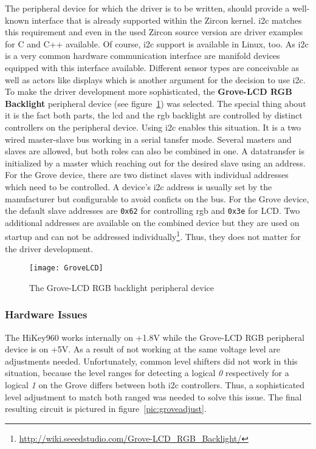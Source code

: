 The peripheral device for which the driver is to be written, should provide a well-known interface that is already supported within the Zircon kernel.
\ac{i2c} matches this requirement and even in the used Zircon source version are driver examples for C and C++ available.
Of course, \ac{i2c} support is available in Linux, too.
As \ac{i2c} is a very common hardware communication interface are manifold devices equipped with this interface available.
Different sensor types are conceivable as well as actors like displays which is another argument for the decision to use \ac{i2c}.
To make the driver development more sophisticated, the \textbf{Grove-LCD RGB Backlight} peripheral device (see figure~\ref{pic:grove}) was selected.
The special thing about it is the fact both parts, the \ac{lcd} and the \acs{rgb} backlight are controlled by distinct controllers on the peripheral device.
Using \ac{i2c} enables this situation.
It is a two wired master-slave bus working in a serial tansfer mode.
Several masters and slaves are allowed, but both roles can also be combined in one.
A datatransfer is initialized by a master which reaching out for the desired slave using an address.
For the Grove device, there are two distinct slaves with individual addresses which need to be controlled.
A device's \ac{i2c} address is usually set by the manufacturer but configurable to avoid conficts on the bus.
For the Grove device, the default slave addresses are \texttt{0x62} for controlling \ac{rgb} and \texttt{0x3e} for LCD\@.
Two additional addresses are available on the combined device but they are used on startup and can not be addressed individually\footnote{\url{http://wiki.seeedstudio.com/Grove-LCD_RGB_Backlight/}}.
Thus, they does not matter for the driver development.

\begin{figure} [t]
    \centering
    \texttt{[image: GroveLCD]}
    \caption{The Grove-LCD RGB backlight peripheral device}\label{pic:grove}
\end{figure} 

\subsubsection*{Hardware Issues}
The HiKey960 works internally on +1.8V  while the Grove-LCD RGB peripheral device is on +5V.
As a result of not working at the same voltage level are adjustments needed.
Unfortunately, common level shifters did not work in this situation, because the level ranges for detecting a logical \textit{0} respectively for a logical \textit{1} on the Grove differs between both \ac{i2c} controllers.
Thus, a sophisticated level adjustment to match both ranged was needed to solve this issue.
The final resulting circuit is pictured in figure~\ref{pic:groveadjust}.

